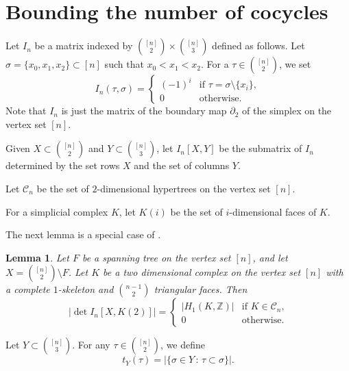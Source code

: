 \documentclass[11pt,a4paper]{article}
\theoremstyle{plain}
\newtheorem{lemma}[theorem]{Lemma}
\theoremstyle{definition}
\begin{document}
\section{Bounding the number of cocycles}

Let $I_{n}$ be a matrix indexed by ${{[n]}\choose {2}}\times {{[n]}\choose{3}}$ defined as follows. Let $\sigma=\{x_0,x_1,x_2\}\subset [n]$ such that $x_0<x_1<x_2$. For a $\tau\in {{[n]}\choose {2}}$, we set
\[I_{n}(\tau,\sigma)=\begin{cases}
(-1)^i&\text{if }\tau=\sigma\setminus\{x_i\},\\
0&\text{otherwise.}
\end{cases}
\]  
Note that $I_{n}$ is just the matrix of the boundary map $\partial_2$ of the simplex on the vertex set $[n]$.

Given $X\subset {{[n]}\choose {2}}$ and $Y\subset {{[n]}\choose {3}}$, let $I_n[X,Y]$ be the submatrix of $I_n$ determined by the set rows $X$ and the set of columns $Y$.

Let $\mathcal{C}_n$ be the set of $2$-dimensional hypertrees on the vertex set $[n]$.

For a simplicial complex $K$, let $K(i)$ be the set of $i$-dimensional faces of $K$.

The next lemma is a special case of \cite[Proposition 4.2]{duval2009simplicial}.
\begin{lemma}\label{detH}
Let $F$ be a spanning tree on the vertex set $[n]$, and let $X={{[n]}\choose {2}}\setminus F$. Let $K$ be a two dimensional complex on the vertex set $[n]$ with a complete $1$-skeleton and ${{n-1}\choose 2}$ triangular faces. Then
\[\left|\det I_n[X,K(2)]\right|=\begin{cases}
|H_1(K,\mathbb{Z})|&\text{if $K\in \mathcal{C}_n$,}\\
0&\text{otherwise.}
\end{cases}\]

\end{lemma}


Let $Y\subset {{[n]}\choose {3}}$. For any $\tau\in {{[n]}\choose {2}}$, we define
\[t_Y(\tau)=|\{\sigma\in Y\,:\, \tau\subset \sigma\}|.\]
\end{document}
